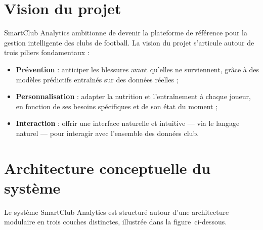 \section{Vision du projet}

SmartClub Analytics ambitionne de devenir la plateforme de référence pour la gestion intelligente des clubs de football. La vision du projet s'articule autour de trois piliers fondamentaux :

\begin{itemize}
    \item \textbf{Prévention} : anticiper les blessures avant qu'elles ne surviennent, grâce à des modèles prédictifs entraînés sur des données réelles ;
    \item \textbf{Personnalisation} : adapter la nutrition et l'entraînement à chaque joueur, en fonction de ses besoins spécifiques et de son état du moment ;
    \item \textbf{Interaction} : offrir une interface naturelle et intuitive — via le langage naturel — pour interagir avec l'ensemble des données club.
\end{itemize}

\section{Architecture conceptuelle du système}

Le système SmartClub Analytics est structuré autour d'une architecture modulaire en trois couches distinctes, illustrée dans la figure~ci-dessous.


